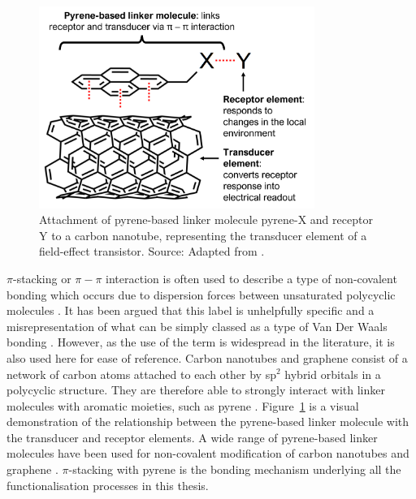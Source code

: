 \documentclass[
  a4paper,
]{scrbook}
\begin{document}
\begin{figure}

{\centering \includegraphics[width=0.8\textwidth,height=\textheight]{figures/ch6/pyrene-cnt.png}

}

\caption{\label{fig-pi-interaction-cnt}Attachment of pyrene-based linker
molecule pyrene-X and receptor Y to a carbon nanotube, representing the
transducer element of a field-effect transistor. Source: Adapted from
\autocite{Carbonnanotube}.}

\end{figure}

\(\pi\)-stacking or \(\pi-\pi\) interaction is often used to describe a
type of non-covalent bonding which occurs due to dispersion forces
between unsaturated polycyclic molecules \autocite{Perez2015}. It has
been argued that this label is unhelpfully specific and a
misrepresentation of what can be simply classed as a type of Van Der
Waals bonding \autocite{Martinez2012,Perez2015}. However, as the use of
the term is widespread in the literature, it is also used here for ease
of reference. Carbon nanotubes and graphene consist of a network of
carbon atoms attached to each other by sp\(^{2}\) hybrid orbitals in a
polycyclic structure. They are therefore able to strongly interact with
linker molecules with aromatic moieties, such as pyrene
\autocite{Hermanson2013-16,Perez2015,Mishyn2022}.
Figure~\ref{fig-pi-interaction-cnt} is a visual demonstration of the
relationship between the pyrene-based linker molecule with the
transducer and receptor elements. A wide range of pyrene-based linker
molecules have been used for non-covalent modification of carbon
nanotubes and graphene \autocite{Zhou2019}. \(\pi\)-stacking with pyrene
is the bonding mechanism underlying all the functionalisation processes
in this thesis.
\end{document}
